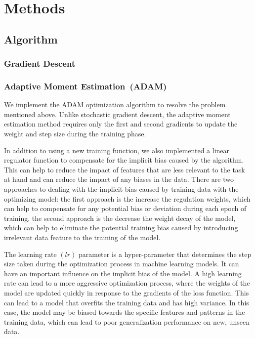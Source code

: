 \chapter{Methods}


\section{Algorithm}

\subsection{Gradient Descent}

\subsection{Adaptive Moment Estimation\ (ADAM)}
We implement the ADAM optimization algorithm to resolve the problem mentioned above. Unlike stochastic gradient descent, the adaptive moment estimation method requires only the first and second gradients to update the weight and step size during the training phase. 

In addition to using a new training function, we also implemented a linear regulator function to compensate for the implicit bias caused by the algorithm. This can help to reduce the impact of features that are less relevant to the task at hand and can reduce the impact of any biases in the data. There are two approaches to dealing with the implicit bias caused by training data with the optimizing model: the first approach is the increase the regulation weights, which can help to compensate for any potential bias or deviation during each epoch of training, the second approach is the decrease the weight decay of the model, which can help to eliminate the potential training bias caused by introducing irrelevant data feature to the training of the model. 

The learning rate $(lr)$ parameter is a hyper-parameter that determines the step size taken during the optimization process in machine learning models. It can have an important influence on the implicit bias of the model. A high learning rate can lead to a more aggressive optimization process, where the weights of the model are updated quickly in response to the gradients of the loss function. This can lead to a model that overfits the training data and has high variance. In this case, the model may be biased towards the specific features and patterns in the training data, which can lead to poor generalization performance on new, unseen data.

